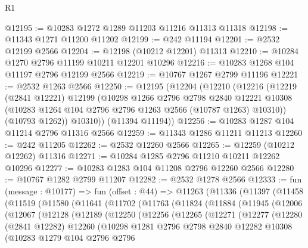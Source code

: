 \begin{lexlean}{R1}
\begin{coremodule}
@12195 := @10283 @1272 @1289 @11203 @11216 @11313 @11318
@12198 := @11343 @1271 @11200 @11202
@12199 := @242 @11194
@12201 := @2532 @12199 @2566
@12204 := @12198 (@10212 @12201) @11313
@12210 := @10284 @1270 @2796 @11199 @10211 @12201 @10296
@12216 := @10283 @1268 @104 @11197 @2796 @12199 @2566
@12219 := @10767 @1267 @2799 @11196
@12221 := @2532 @1263 @2566
@12250 := @12195
    (@12204
      (@12210
        (@12216
          (@12219
            (@2841 @12221)
            @12199
            (@10298
              @1266
              @2796
              @2798
              @2840
              @12221
              @10308
              (@10283 @1264 @104 @2796 @2796 @1263 @2566 (@10787 @1263) @10310))
            (@10793 @1262))
          @10310))
      (@11394 @11194))
@12256 := @10283 @1287 @104 @11214 @2796 @11316 @2566
@12259 := @11343 @1286 @11211 @11213
@12260 := @242 @11205
@12262 := @2532 @12260 @2566
@12265 := @12259 (@10212 @12262) @11316
@12271 := @10284 @1285 @2796 @11210 @10211 @12262 @10296
@12277 := @10283 @1283 @104 @11208 @2796 @12260 @2566
@12280 := @10767 @1282 @2799 @11207
@12282 := @2532 @1278 @2566
@12333 := fun (message : @10177) =>
  fun (offset : @44) =>
  @11263
    (@11336
      (@11397
        (@11458
          (@11519
            (@11580
              (@11641
                (@11702
                  (@11763
                    (@11824
                      (@11884
                        (@11945
                          (@12006
                            (@12067
                              (@12128
                                (@12189
                                  (@12250
                                    (@12256
                                      (@12265
                                        (@12271
                                          (@12277
                                            (@12280
                                              (@2841 @12282)
                                              @12260
                                              (@10298
                                                @1281
                                                @2796
                                                @2798
                                                @2840
                                                @12282
                                                @10308
                                                (@10283
                                                  @1279
                                                  @104
                                                  @2796
                                                  @2796

\end{coremodule}
\end{lexlean}
